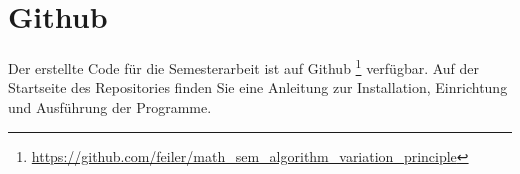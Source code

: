 %
%
%
%
\section{Github 
\label{beispiel:section:teil5}}

Der erstellte Code für die Semesterarbeit ist auf Github 
\footnote{\url{https://github.com/feiler/math_sem_algorithm_variation_principle}}
\cite{algorythm:repo} verfügbar. 
Auf der Startseite des Repositories finden Sie eine Anleitung zur Installation, 
Einrichtung und Ausführung der Programme.